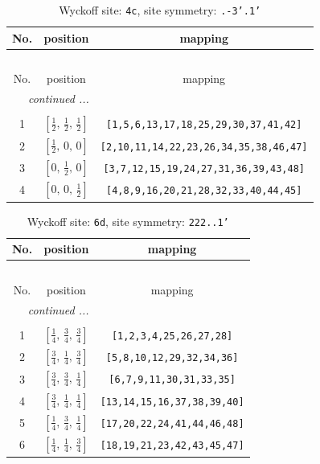 \documentclass[fleqn,8pt]{jsarticle}
\begin{document}
\renewcommand{\arraystretch}{1.2}
\begin{longtable}{ccc}
\caption{Wyckoff site: {\tt 4c}, site symmetry: {\tt .-3'.1'}}
 \\
 \hline \hline
No. & position & mapping \\ \hline \endfirsthead

\multicolumn{2}{l}{\tablename\ \thetable{}} \\
 \hline \hline
No. & position & mapping \\ \hline \endhead

 \hline \hline
\multicolumn{2}{r}{\footnotesize\it continued ...} \\ \endfoot

 \hline \hline
\multicolumn{2}{r}{} \\ \endlastfoot

1 & $\left[ \frac{1}{2},\, \frac{1}{2},\, \frac{1}{2} \right]$ & {\tt [1,5,6,13,17,18,25,29,30,37,41,42]} \\ \hline
2 & $\left[ \frac{1}{2},\, 0,\, 0 \right]$ & {\tt [2,10,11,14,22,23,26,34,35,38,46,47]} \\ \hline
3 & $\left[ 0,\, \frac{1}{2},\, 0 \right]$ & {\tt [3,7,12,15,19,24,27,31,36,39,43,48]} \\ \hline
4 & $\left[ 0,\, 0,\, \frac{1}{2} \right]$ & {\tt [4,8,9,16,20,21,28,32,33,40,44,45]} \\
\end{longtable}
\renewcommand{\arraystretch}{1.2}
\begin{longtable}{ccc}
\caption{Wyckoff site: {\tt 6d}, site symmetry: {\tt 222..1'}}
 \\
 \hline \hline
No. & position & mapping \\ \hline \endfirsthead

\multicolumn{2}{l}{\tablename\ \thetable{}} \\
 \hline \hline
No. & position & mapping \\ \hline \endhead

 \hline \hline
\multicolumn{2}{r}{\footnotesize\it continued ...} \\ \endfoot

 \hline \hline
\multicolumn{2}{r}{} \\ \endlastfoot

1 & $\left[ \frac{1}{4},\, \frac{3}{4},\, \frac{3}{4} \right]$ & {\tt [1,2,3,4,25,26,27,28]} \\ \hline
2 & $\left[ \frac{3}{4},\, \frac{1}{4},\, \frac{3}{4} \right]$ & {\tt [5,8,10,12,29,32,34,36]} \\ \hline
3 & $\left[ \frac{3}{4},\, \frac{3}{4},\, \frac{1}{4} \right]$ & {\tt [6,7,9,11,30,31,33,35]} \\ \hline
4 & $\left[ \frac{3}{4},\, \frac{1}{4},\, \frac{1}{4} \right]$ & {\tt [13,14,15,16,37,38,39,40]} \\ \hline
5 & $\left[ \frac{1}{4},\, \frac{3}{4},\, \frac{1}{4} \right]$ & {\tt [17,20,22,24,41,44,46,48]} \\ \hline
6 & $\left[ \frac{1}{4},\, \frac{1}{4},\, \frac{3}{4} \right]$ & {\tt [18,19,21,23,42,43,45,47]} \\
\end{longtable}
\end{document}
